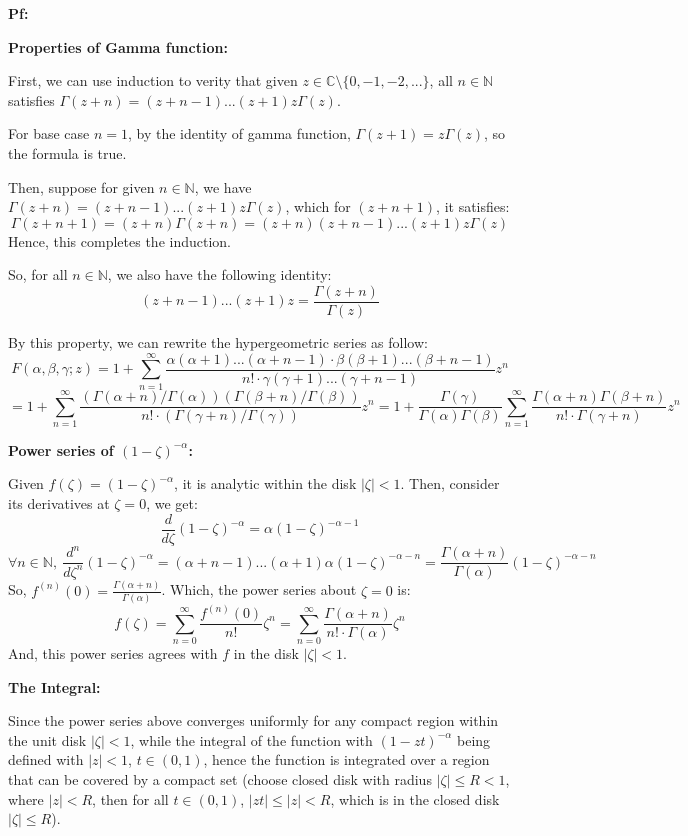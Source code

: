 \documentclass{article}
\begin{document}
\textbf{Pf:}

\textbf{Properties of Gamma function:}

First, we can use induction to verity that given $z\in \mathbb{C}\setminus\{0,-1,-2,...\}$, all $n\in\mathbb{N}$ satisfies $\Gamma(z+n)=(z+n-1)...(z+1)z\Gamma(z)$. 

For base case $n=1$, by the identity of gamma function, $\Gamma(z+1)=z\Gamma(z)$, so the formula is true.

Then, suppose for given $n\in\mathbb{N}$, we have $\Gamma(z+n)=(z+n-1)...(z+1)z\Gamma(z)$, which for $(z+n+1)$, it satisfies:
$$\Gamma(z+n+1)=(z+n)\Gamma(z+n)=(z+n)(z+n-1)...(z+1)z\Gamma(z)$$
Hence, this completes the induction.

So, for all $n\in\mathbb{N}$, we also have the following identity:
$$(z+n-1)...(z+1)z = \frac{\Gamma(z+n)}{\Gamma(z)}$$

By this property, we can rewrite the hypergeometric series as follow:
$$F(\alpha,\beta,\gamma;z)=1+\sum_{n=1}^{\infty}\frac{\alpha(\alpha+1)...(\alpha+n-1)\cdot \beta(\beta+1)...(\beta+n-1)}{n!\cdot \gamma(\gamma+1)...(\gamma+n-1)}z^n $$
$$= 1+\sum_{n=1}^{\infty}\frac{(\Gamma(\alpha+n)/\Gamma(\alpha))(\Gamma(\beta+n)/\Gamma(\beta))}{n!\cdot (\Gamma(\gamma+n)/\Gamma(\gamma))}z^n = 1+\frac{\Gamma(\gamma)}{\Gamma(\alpha)\Gamma(\beta)}\sum_{n=1}^{\infty}\frac{\Gamma(\alpha+n)\Gamma(\beta+n)}{n!\cdot \Gamma(\gamma+n)}z^n$$

\hfil

\textbf{Power series of $(1-\zeta)^{-\alpha}$:}

Given $f(\zeta)=(1-\zeta)^{-\alpha}$, it is analytic within the disk $|\zeta|<1$. Then, consider its derivatives at $\zeta=0$, we get:
$$\frac{d}{d\zeta}(1-\zeta)^{-\alpha}=\alpha(1-\zeta)^{-\alpha-1}$$
$$\forall n\in\mathbb{N},\ \frac{d^n}{d\zeta^n}(1-\zeta)^{-\alpha}=(\alpha+n-1)...(\alpha+1)\alpha(1-\zeta)^{-\alpha-n}=\frac{\Gamma(\alpha+n)}{\Gamma(\alpha)}(1-\zeta)^{-\alpha-n}$$
So, $f^{(n)}(0)=\frac{\Gamma(\alpha+n)}{\Gamma(\alpha)}$. Which, the power series about $\zeta=0$ is:
$$f(\zeta)=\sum_{n=0}^{\infty}\frac{f^{(n)}(0)}{n!}\zeta^n = \sum_{n=0}^{\infty}\frac{\Gamma(\alpha+n)}{n!\cdot\Gamma(\alpha)}\zeta^n$$
And, this power series agrees with $f$ in the disk $|\zeta|<1$.

\hfil

\textbf{The Integral:}

Since the power series above converges uniformly for any compact region within the unit disk $|\zeta|<1$, while the integral of the function with $(1-zt)^{-\alpha}$ being defined with $|z|<1$, $t\in (0,1)$, hence the function is integrated over a region that can be covered by a compact set (choose closed disk with radius $|\zeta|\leq R<1$, where $|z|<R$, then for all $t\in (0,1)$, $|zt|\leq |z|<R$, which is in the closed disk $|\zeta|\leq R$).
\end{document}
